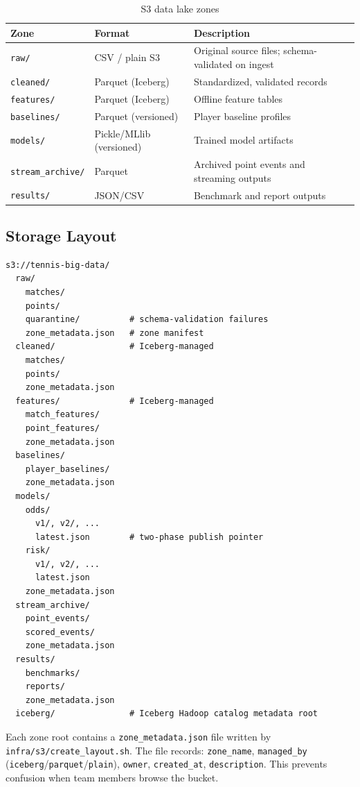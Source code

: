 \documentclass[11pt,a4paper]{article}
\begin{document}
\begin{table}[H]
\centering
\begin{tabularx}{\linewidth}{L{3cm}L{3cm}X}
\toprule
\textbf{Zone} & \textbf{Format} & \textbf{Description} \\
\midrule
\texttt{raw/} & CSV / plain S3 & Original source files; schema-validated on ingest \\
\texttt{cleaned/} & Parquet (Iceberg) & Standardized, validated records \\
\texttt{features/} & Parquet (Iceberg) & Offline feature tables \\
\texttt{baselines/} & Parquet (versioned) & Player baseline profiles \\
\texttt{models/} & Pickle/MLlib (versioned) & Trained model artifacts \\
\texttt{stream\_archive/} & Parquet & Archived point events and streaming outputs \\
\texttt{results/} & JSON/CSV & Benchmark and report outputs \\
\bottomrule
\end{tabularx}
\caption{S3 data lake zones}
\end{table}

\subsection{Storage Layout}

\begin{lstlisting}
s3://tennis-big-data/
  raw/
    matches/
    points/
    quarantine/          # schema-validation failures
    zone_metadata.json   # zone manifest
  cleaned/               # Iceberg-managed
    matches/
    points/
    zone_metadata.json
  features/              # Iceberg-managed
    match_features/
    point_features/
    zone_metadata.json
  baselines/
    player_baselines/
    zone_metadata.json
  models/
    odds/
      v1/, v2/, ...
      latest.json        # two-phase publish pointer
    risk/
      v1/, v2/, ...
      latest.json
    zone_metadata.json
  stream_archive/
    point_events/
    scored_events/
    zone_metadata.json
  results/
    benchmarks/
    reports/
    zone_metadata.json
  iceberg/               # Iceberg Hadoop catalog metadata root
\end{lstlisting}

\begin{minorbox}
Each zone root contains a \texttt{zone\_metadata.json} file written by
\texttt{infra/s3/create\_layout.sh}. The file records:
\texttt{zone\_name}, \texttt{managed\_by} (\texttt{iceberg}/\texttt{parquet}/\texttt{plain}),
\texttt{owner}, \texttt{created\_at}, \texttt{description}. This prevents confusion when team
members browse the bucket.
\end{minorbox}
\end{document}

